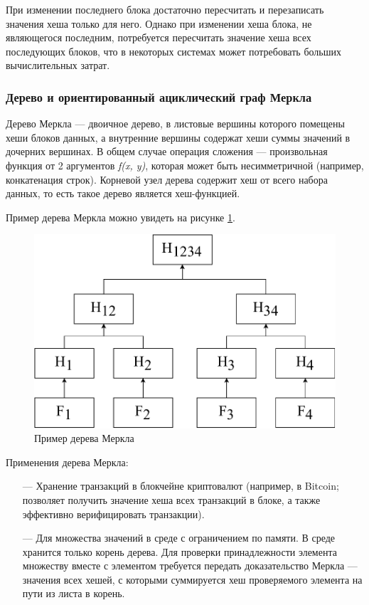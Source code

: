 При изменении последнего блока достаточно пересчитать и перезаписать значения хеша только для него. Однако при изменении хеша блока, не являющегося последним, потребуется пересчитать значение хеша всех последующих блоков, что в некоторых системах может потребовать больших вычислительных затрат.

\subsubsection{Дерево и ориентированный ациклический граф Меркла}

Дерево Меркла \cite{merkle} --- двоичное дерево, в листовые вершины которого помещены хеши блоков данных, а внутренние вершины содержат хеши суммы значений в дочерних вершинах. В общем случае операция сложения --- произвольная функция от 2 аргументов \textit{f(x, y)}, которая может быть несимметричной (например, конкатенация строк). Корневой узел дерева содержит хеш от всего набора данных, то есть такое дерево является хеш-функцией.

Пример дерева Меркла можно увидеть на рисунке \ref{fig:mtree}.

\begin{figure}[hbtp]
	\centering
	\includegraphics[width=\textwidth]{img/merkletree.pdf}
	\caption{Пример дерева Меркла}
	\label{fig:mtree}
\end{figure}

Применения дерева Меркла:
\begin{itemize}
	\item[---] Хранение транзакций в блокчейне криптовалют (например, в Bitcoin; позволяет получить значение хеша всех транзакций в блоке, а также эффективно верифицировать транзакции).
	\item[---] Для множества значений в среде с ограничением по памяти. В среде хранится только корень дерева. Для проверки принадлежности элемента множеству вместе с элементом требуется передать доказательство Меркла --- значения всех хешей, с которыми суммируется хеш проверяемого элемента на пути из листа в корень.
\end{itemize}


